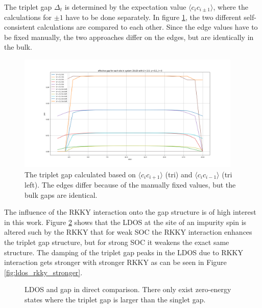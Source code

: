 The triplet gap $\Delta_t$ is determined by the expectation value $\langle c_i c_{i\pm1}\rangle$, where the calculations for $\pm 1$ have to be done separately.
In figure \ref{fig:triplet_leftright}, the two different self-consistent calculations are compared to each other. 
Since the edge values have to be fixed manually, the two approaches differ on the edges, but are identically in the bulk.

\begin{figure}[h!]
    \centering
    \includegraphics[width=0.95\textwidth]{Images/33_leftright_comp_20x20.png}
    \caption{The triplet gap calculated based on $\langle c_i c_{i+ 1}\rangle$ (tri) and $\langle c_i c_{i-1}\rangle$ (tri left). The edges differ because of the manually fixed values, but the bulk gaps are identical.}
    \label{fig:triplet_leftright}
\end{figure}

The influence of the RKKY interaction onto the gap structure is of high interest in this work.
Figure \ref{fig:ldos_triplet_rkky} shows that the LDOS at the site of an impurity spin is altered such by the RKKY that for weak SOC the RKKY interaction enhances the triplet gap structure, but for strong SOC it weakens the exact same structure. \newline
The damping of the triplet gap peaks in the LDOS due to RKKY interaction gets stronger with stronger RKKY as can be seen in Figure \ref{fig:ldos_rkky_stronger}.

\begin{figure}[H]
    \centering
    \caption{LDOS and gap in direct comparison. There only exist zero-energy states where the triplet gap is larger than the singlet gap.}
    \label{fig:ldos_triplet_rkky}
\end{figure}

